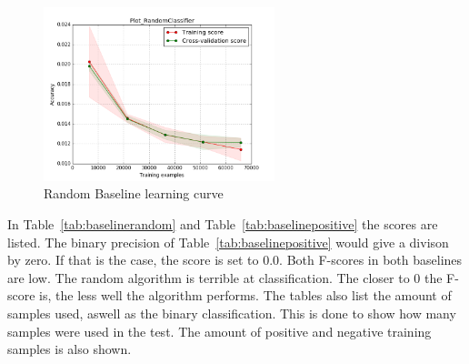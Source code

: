 \begin{figure}[H]
\centering
\includegraphics[width=0.6\textwidth]{Figures/Plot_RandomClassifier}
\decoRule
\caption[Random Baseline learning curve]{Random Baseline learning curve}
\label{fig:randombaseline}
\end{figure}

\noindent In Table~\ref{tab:baselinerandom} and Table~\ref{tab:baselinepositive} the scores are listed. The binary precision of Table~\ref{tab:baselinepositive} would give a divison by zero. If that is the case, the score is set to $0.0$. Both F-scores in both baselines are low. The random algorithm is terrible at classification. The closer to $0$ the F-score is, the less well the algorithm performs. The tables also list the amount of samples used, aswell as the binary classification. This is done to show how many samples were used in the test. The amount of positive and negative training samples is also shown.

